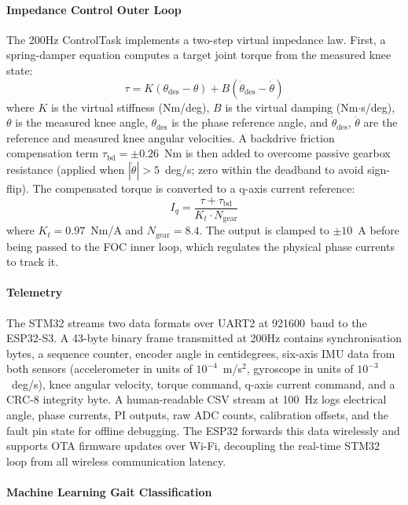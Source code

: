 \documentclass[11pt]{article}
\begin{document}
\paragraph{Impedance Control Outer Loop}

The 200Hz ControlTask implements a two-step virtual impedance law. First, a spring-damper equation computes a target joint torque from the measured knee state:
\begin{equation}
    \tau = K(\theta_\text{des} - \theta) + B(\dot{\theta}_\text{des} - \dot{\theta})
\end{equation}
where $K$ is the virtual stiffness (Nm/deg), $B$ is the virtual damping (Nm$\cdot$s/deg), $\theta$ is the measured knee angle, $\theta_\text{des}$ is the phase reference angle, and $\dot{\theta}_\text{des}$, $\dot{\theta}$ are the reference and measured knee angular velocities. A backdrive friction compensation term $\tau_\text{bd} = \pm0.26$~Nm is then added to overcome passive gearbox resistance (applied when $|\dot{\theta}| > 5$~deg/s; zero within the deadband to avoid sign-flip). The compensated torque is converted to a q-axis current reference:
\begin{equation}
    I_q = \frac{\tau + \tau_\text{bd}}{K_t \cdot N_\text{gear}}
\end{equation}
where $K_t = 0.97$~Nm/A and $N_\text{gear} = 8.4$. The output is clamped to $\pm10$~A before being passed to the FOC inner loop, which regulates the physical phase currents to track it.

\paragraph{Telemetry}

The STM32 streams two data formats over UART2 at 921600~baud to the ESP32-S3. A 43-byte binary frame transmitted at 200Hz contains synchronisation bytes, a sequence counter, encoder angle in centidegrees, six-axis IMU data from both sensors (accelerometer in units of $10^{-4}$~m/s$^2$, gyroscope in units of $10^{-3}$~deg/s), knee angular velocity, torque command, q-axis current command, and a CRC-8 integrity byte. A human-readable CSV stream at 100~Hz logs electrical angle, phase currents, PI outputs, raw ADC counts, calibration offsets, and the fault pin state for offline debugging. The ESP32 forwards this data wirelessly and supports OTA firmware updates over Wi-Fi, decoupling the real-time STM32 loop from all wireless communication latency.

\paragraph{Machine Learning Gait Classification}
\end{document}
